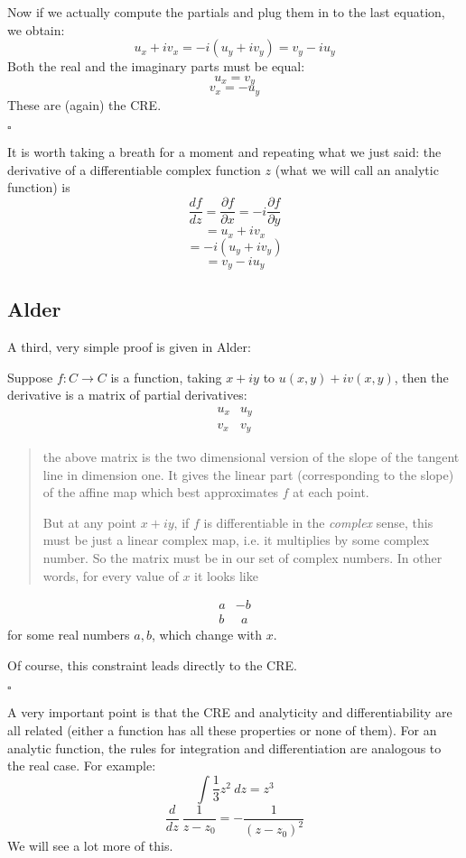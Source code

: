 \documentclass[11pt, oneside]{article}
\begin{document}
Now if we actually compute the partials and plug them in to the last equation, we obtain:
\[ u_x + i v_x = -i (u_y + i v_y) = v_y - i u_y \]
Both the real and the imaginary parts must be equal:
\[ u_x = v_y \]
\[ v_x = - u_y \]
These are (again) the CRE.

$\square$

It is worth taking a breath for a moment and repeating what we just said:  the derivative of a differentiable complex function $z$ (what we will call an analytic function) is
\[ \frac{df}{dz} = \frac{\partial f}{\partial x} = - i \frac{\partial f}{\partial y} \]
\[ = u_x + i v_x \]
\[ = -i (u_y + i v_y) \]
\[ = v_y - i u_y\] 

\subsection*{Alder}
A third, very simple proof is given in Alder:

Suppose $f: C \rightarrow C$ is a function, taking $x+iy$ to $u(x,y) + iv(x,y)$, then the derivative is a matrix of partial derivatives:
\[
\begin{matrix}
u_x &  u_y \\
v_x & v_y
\end{matrix}
\]

\begin{quote}the above matrix is the two dimensional version of the slope of the tangent line in dimension one.  It gives the linear part (corresponding to the slope) of the affine map which best approximates $f$ at each point.

But at any point $x + iy$, if $f$ is differentiable in the \emph{complex} sense, this must be just a linear complex map, i.e. it multiplies by some complex number.  So the matrix must be in our set of complex numbers.  In other words, for every value of $x$ it looks like
\end{quote}
\[
\begin{matrix}
a & -b \\
b &  \ \ a
\end{matrix}
\]
for some real numbers $a,b$, which change with $x$.

Of course, this constraint leads directly to the CRE.

$\square$

A very important point is that the CRE and analyticity and differentiability are all related  (either a function has all these properties or none of them).  For an analytic function, the rules for integration and differentiation are analogous to the real case.  For example:
\[ \int \frac{1}{3} z^2 \ dz = z^3 \]
\[ \frac{d}{dz} \ \frac{1}{z - z_0} = - \frac{1}{(z-z_0)^2} \]
We will see a lot more of this.
\end{document}
